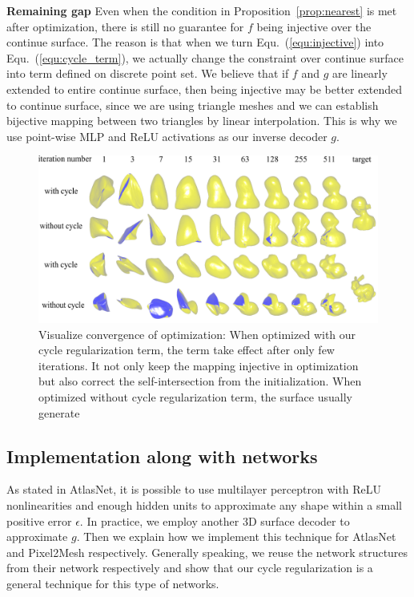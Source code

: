 \noindent\textbf{Remaining gap}
Even when the condition in Proposition~\ref{prop:nearest} is met after optimization, there is still no guarantee for $f$ being injective over the continue surface. The reason is that when we turn Equ.~(\ref{equ:injective}) into Equ.~(\ref{equ:cycle_term}), we actually change the constraint over continue surface into term defined on discrete point set. We believe that if $f$ and $g$ are linearly extended to entire continue surface, then being injective may be better extended to continue surface, since we are using triangle meshes and we can establish bijective mapping between two triangles by linear interpolation. This is why we use point-wise MLP and ReLU activations as our inverse decoder $g$.
\begin{figure}[htbp]
	\centering
	\includegraphics[width=\linewidth]{img/opt/opt}
	\caption{Visualize convergence of optimization: When optimized with our cycle regularization term, the term take effect after only few iterations. It not only keep the mapping injective in optimization but also correct the self-intersection from the initialization. When optimized without cycle regularization term, the surface usually generate }
	\label{fig:opt}
\end{figure}
\subsection{Implementation along with networks}

As stated in AtlasNet\cite{atlasnet}, it is possible to use multilayer perceptron with ReLU nonlinearities and enough hidden units to approximate any shape within a small positive error $\epsilon$. In practice, we employ another 3D surface decoder to approximate $g$. Then we explain how we implement this technique for AtlasNet and Pixel2Mesh respectively. Generally speaking, we reuse the network structures from their network respectively and show that our cycle regularization is a general technique for this type of networks.

